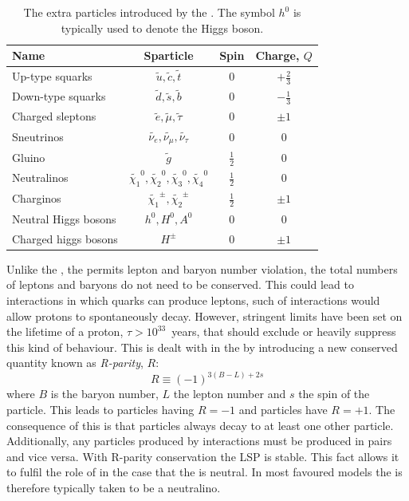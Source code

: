 \begin{table}
\begin{tabular}{|l|c|c|c|}
Name & Sparticle & Spin & Charge, $Q$ \\
\hline
Up-type squarks & $\tilde{u},\tilde{c},\tilde{t}$ & 0 & $+\frac{2}{3}$ \\
Down-type squarks & $\tilde{d},\tilde{s},\tilde{b}$ & 0 & $-\frac{1}{3}$ \\
Charged sleptons & $\tilde{e},\tilde{\mu},\tilde{\tau}$ & 0 & $\pm1$ \\
Sneutrinos & $\tilde{\nu_{e}},\tilde{\nu_{\mu}},\tilde{\nu_{\tau}}$ & 0 & 0 \\
\hline
Gluino & $\tilde{g}$ & $\frac{1}{2}$ & 0 \\
Neutralinos &
$\tilde{\chi_{1}}^0,\tilde{\chi_{2}}^0,\tilde{\chi_{3}}^0,\tilde{\chi_{4}}^0$
& $\frac{1}{2}$ & 0  \\
Charginos & $\tilde{\chi_{1}}^{\pm},\tilde{\chi_{2}}^{\pm}$ &
$\frac{1}{2}$ & $\pm1$ \\
\hline
Neutral Higgs bosons & $h^0,H^0,A^0$ & 0 & 0 \\
Charged higgs bosons & $H^{\pm}$ & 0 & $\pm1$ \\
\end{tabular}
\caption{The extra particles introduced by the \MSSM. The symbol $h^0$
is typically used to denote the \SM Higgs boson.
\cite{Martin:1997ns}}
\label{tab:susy}
\end{table}

Unlike the \SM, the \MSSM permits lepton and baryon number violation,
the total numbers of leptons and baryons do not need to be conserved.
This could lead to interactions in which quarks can produce leptons,
such of interactions would allow protons to spontaneously decay.
However, stringent limits have been set on the lifetime of a proton,
$\tau>10^{33}$~years, that should exclude or heavily suppress this
kind of behaviour. This is dealt with in the \MSSM by introducing a
new conserved quantity known as \emph{R-parity}, $R$:
\begin{equation}
R\equiv (-1)^{3(B-L)+2s}
\end{equation}
where $B$ is the baryon number, $L$ the lepton number and $s$ the spin
of the particle. This leads to \SUSY particles having $R=-1$ and \SM
particles have $R=+1$. The consequence of this is that \SUSY particles
always decay to at least one other \SUSY particle. Additionally, any
\SUSY particles produced by \SM interactions must be produced in
pairs and vice versa. With R-parity conservation the \acf{LSP} is
stable. This fact allows it to fulfil the role of \DM in the case that
the \LSP is neutral. In most favoured \SUSY models the \LSP is
therefore typically taken to be a neutralino.

